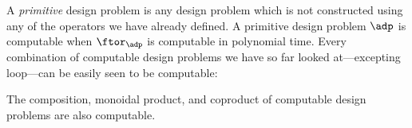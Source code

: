 A \emph{primitive} design problem is any design problem which is not constructed using any of the operators we have already defined.
A primitive design problem $\adp$ is computable when $\ftor_\adp$ is computable in polynomial time.
Every combination of computable design problems we have so far looked at---excepting loop---can be easily seen to be computable:

\begin{proposition}
    The composition, monoidal product, and coproduct of computable design problems are also computable.
\end{proposition}

